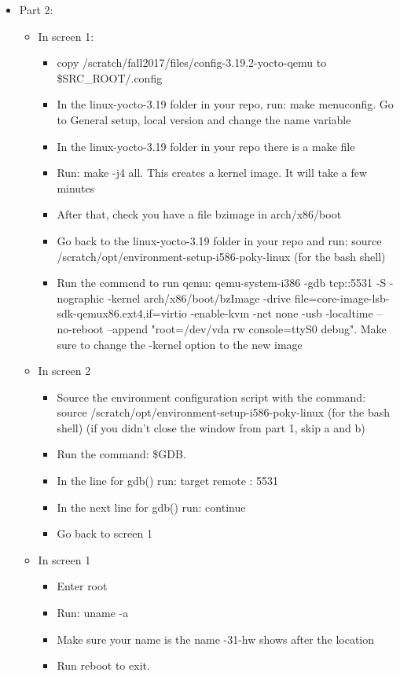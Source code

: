 \documentclass{article}
\begin{document}
\begin{itemize}
\item Part 2:
\begin{itemize}
\item In screen 1:
\begin{itemize}
\item copy /scratch/fall2017/files/config-3.19.2-yocto-qemu to \$SRC\_ROOT/.config
\item In the linux-yocto-3.19 folder in your repo, run: make menuconfig. Go to General setup, local version and change the name variable
\item In the linux-yocto-3.19 folder in your repo there is a make file
\item Run: make -j4 all. This creates a kernel image. It will take a few minutes
\item After that, check you have a file bzimage in arch/x86/boot 
\item Go back to the linux-yocto-3.19 folder in your repo and run: source /scratch/opt/environment-setup-i586-poky-linux (for the bash shell)
\item Run the commend to run qemu: qemu-system-i386 -gdb tcp::5531 -S -nographic -kernel arch/x86/boot/bzImage -drive file=core-image-lsb-sdk-qemux86.ext4,if=virtio -enable-kvm -net none -usb -localtime --no-reboot --append "root=/dev/vda rw console=ttyS0 debug". Make sure to change the -kernel option to the new image
\end{itemize}
\item In screen 2
\begin{itemize}
\item Source the environment configuration script with the command: source /scratch/opt/environment-setup-i586-poky-linux (for the bash shell) (if you didn’t close the window from part 1, skip a and b)
\item Run the command: \$GDB.
\item In the line for gdb() run: target remote : 5531
\item In the next line for gdb() run: continue
\item Go back to screen 1
\end{itemize}
\item In screen 1
\begin{itemize}
\item Enter root
\item Run: uname -a 
\item Make sure your name is the name -31-hw shows after the location
\item Run reboot to exit.
\end{itemize}
\end{itemize}
\end{itemize}
\end{document}

